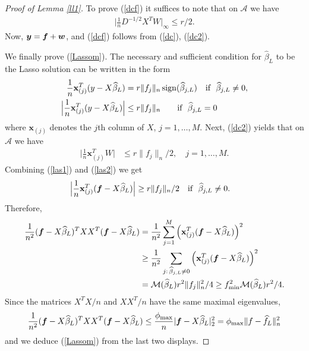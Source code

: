 \documentclass[dvips,aos]{imsart}
\numberwithin{equation}{section}
\theoremstyle{plain}
\def\wideth{\widehat}
\def\scm{{\cal M}}
\def\wh{\widehat}
\def\A{\mbox{$\mathcal A$}}
\newcommand{\bmf}{\mbox{\boldmath$f$}}
\newcommand{\bmy}{\mbox{\boldmath$y$}}
\newcommand{\bmw}{\mbox{\boldmath$w$}}
\begin{document}
\begin{proof}[Proof of Lemma \ref{ll1}]
To prove (\ref{dcf}) it suffices to note that on $\A$ we have
\begin{equation}\begin{split}\label{dc2}
\Big|\frac{1}{n}D^{-1/2}X^TW\Big|_\infty \le r/2.
\end{split}\end{equation}
Now, $\bmy={\bmf }+ \bmw$, and (\ref{dcf}) follows from (\ref{dc}),
(\ref{dc2}).

 We finally prove (\ref{Lassom}). The necessary and
sufficient condition for $\wh \beta_L$ to be the Lasso solution can
be written in the form
\begin{equation}\label{las1}
\begin{split}
\frac{1}{n}{\mathbf x}_{(j)}^T(y-X\wh \beta_L) &= r \|f_j\|_n
\,{\rm
sign}(\wh \beta_{j,L}) \quad\mbox{if \ $\wh\beta_{j,L}\neq 0$},
\\
\Big|\frac{1}{n}{\mathbf x}_{(j)}^T(y-X\wh \beta_L)\Big| &\le r
\|f_j\|_n \qquad \mbox{if \ $\wh\beta_{j,L}= 0$}
\end{split}
\end{equation}
where ${\mathbf x}_{(j)}$ denotes the $j$th column of $X$,
$j=1,\dots,M$. Next, (\ref{dc2}) yields that on $\A$ we have
\begin{equation}\begin{split}\label{las2}
\Big|\frac{1}{n}{\mathbf x}_{(j)}^TW\Big| &\le r \|f_j\|_n/2, \quad
j=1,\dots,M.
\end{split}\end{equation}
Combining (\ref{las1}) and (\ref{las2}) we get
\begin{equation}\begin{split}\label{las3}
\Big|\frac{1}{n}{\mathbf x}_{(j)}^T({\bmf}-X\wh \beta_L)\Big| &\ge
r \|f_j\|_n/2  \quad\mbox{if \ $\wh\beta_{j,L}\neq 0$}.
\end{split}\end{equation}
Therefore,
\begin{eqnarray*}
\frac{1}{n^2}({\bmf}-X\wh \beta_L)^T XX^T ({\bmf}-X\wh \beta_L)
&= \frac{1}{n^2}\sum_{j=1}^M \Big({\mathbf x}_{(j)}^T({\bmf}-X\wh
\beta_L)
\Big)^2\\
%
&\ge \frac{1}{n^2}\sum_{j:\,\wh\beta_{j,L}\neq 0} \Big({\mathbf
x}_{(j)}^T({\bmf}-X\wh \beta_L)\Big)^2 \\
%
&= \scm(\wh\beta_L) r^2 \|f_j\|_n^2/4 \ge f_{\min}^2 \scm(\wh\beta_L)
r^2/4.
\end{eqnarray*}
Since the matrices $X^TX/n$ and $XX^T/n$ have the same maximal
eigenvalues,
$$
\frac{1}{n^2}({\bmf}-X\wh \beta_L)^T XX^T ({\bmf}-X\wh \beta_L)\le
\frac{\phi_{\max}}{n}|{\bmf}-X\wh \beta_L|_2^2 =
\phi_{\max}\|f-\wideth f_L\|_n^2
$$
and we deduce (\ref{Lassom}) from the last two displays.
\end{proof}
\end{document}
